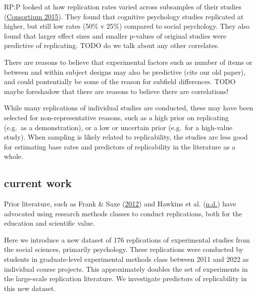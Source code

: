 \documentclass[
  english,
  a4paper,
]{article}
\begin{document}
RP:P looked at how replication rates varied across subsamples of their studies (\protect\hyperlink{ref-openscienceconsortium2015}{Consortium 2015}). They found that cognitive psychology studies replicated at higher, but still low rates (50\% v 25\%) compared to social psychology. They also found that larger effect sizes and smaller p-values of original studies were predictive of replicating. TODO do we talk about any other correlates.

There are reasons to believe that experimental factors such as number of items or between and within subject designs may also be predictive (cite our old paper), and could pontentially be some of the reason for subfield differences. TODO maybe foreshadow that there are reasons to believe there are correlations!

While many replications of individual studies are conducted, these may have been selected for non-representative reasons, such as a high prior on replicating (e.g.~as a demonstration), or a low or uncertain prior (e.g.~for a high-value study). When sampling is likely related to replicability, the studies are less good for estimating base rates and predictors of replicability in the literature as a whole.

\hypertarget{current-work}{%
\subsection{current work}\label{current-work}}

Prior literature, such as Frank \& Saxe (\protect\hyperlink{ref-frank2012}{2012}) and Hawkins et al. (\protect\hyperlink{ref-hawkins}{n.d.}) have advocated using research methods classes to conduct replications, both for the education and scientific value.

Here we introduce a new dataset of 176 replications of experimental studies from the social sciences, primarily psychology. These replications were conducted by students in graduate-level experimental methods class between 2011 and 2022 as individual course projects. This approximately doubles the set of experiments in the large-scale replication literature. We investigate predictors of replicability in this new dataset.

    
\end{document}
